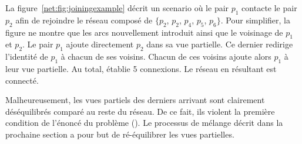 La figure~\ref{net:fig:joiningexample} décrit un scenario où le pair $p_1$ contacte
le pair $p_2$ afin de rejoindre le réseau composé de $\{p_2$, $p_2$, $p_4$,
$p_5$, $p_6\}$. Pour simplifier, la figure ne montre que les arcs nouvellement
introduit ainsi que le voisinage de $p_1$ et $p_2$. Le pair $p_1$ ajoute
directement $p_2$ dans sa vue partielle. Ce dernier redirige l'identité de $p_1$
à chacun de ses voisins.  Chacun de ces voisins ajoute alors $p_1$ à leur vue
partielle. Au total, \SPRAY établie 5 connexions. Le réseau en résultant est
connecté.

Malheureusement, les vues partiels des derniers arrivant sont clairement
déséquilibrés comparé au reste du réseau. De ce fait, ils violent la première
condition de l'énoncé du problème (\REF). Le processus de mélange décrit dans la
prochaine section a pour but de ré-équilibrer les vues partielles.


